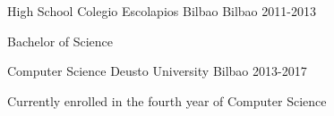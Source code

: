 


\begin{cventries}


\cventry
{High School} %
{Colegio Escolapios Bilbao} %
{Bilbao} %
{2011-2013} %
{ %
\begin{cvitems}
\item {Bachelor of Science}
\end{cvitems}
}

\cventry
{Computer Science} %
{Deusto University} %
{Bilbao} %
{2013-2017} %
{ %
\begin{cvitems}
\item {Currently enrolled in the fourth year of Computer Science}
\end{cvitems}
}


\end{cventries}